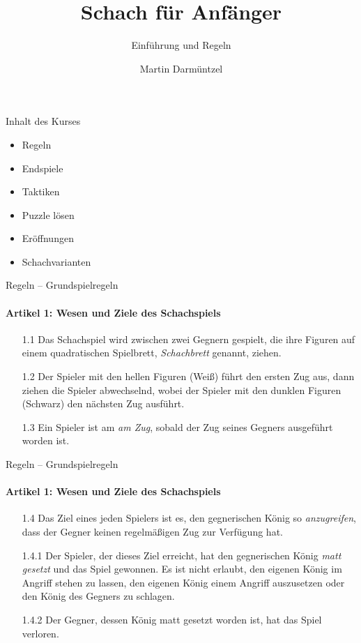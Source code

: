 \documentclass[
  aspectratio=1610,
]{beamer}
\author{Martin Darmüntzel}
\title{Schach für Anfänger}
\subtitle{Einführung und Regeln}
\begin{document}
\begin{frame}
  \titlepage{}
\end{frame}

\begin{frame}{Inhalt des Kurses}
  \begin{itemize}
    \item Regeln
    \item Endspiele
    \item Taktiken
    \item Puzzle lösen
    \item Eröffnungen
    \item Schachvarianten
  \end{itemize}
\end{frame}

\begin{frame}[<+->]{Regeln – Grundspielregeln}
  \framesubtitle{Artikel 1: Wesen und Ziele des Schachspiels}
  \begin{itemize}
    \item[1.1] Das Schachspiel wird zwischen zwei Gegnern gespielt, die ihre Figuren auf
      einem quadratischen Spielbrett, \emph{Schachbrett} genannt, ziehen.
    \item[1.2] Der Spieler mit den hellen Figuren (Weiß) führt den ersten Zug aus, dann
      ziehen die Spieler abwechselnd, wobei der Spieler mit den dunklen Figuren (Schwarz)
      den nächsten Zug ausführt.
    \item[1.3] Ein Spieler ist am \emph{am Zug}, sobald der Zug seines Gegners ausgeführt
      worden ist.
  \end{itemize}
\end{frame}

\begin{frame}[<+->]{Regeln – Grundspielregeln}
  \framesubtitle{Artikel 1: Wesen und Ziele des Schachspiels}
  \begin{itemize}
    \item[1.4] Das Ziel eines jeden Spielers ist es, den gegnerischen König so
      \emph{anzugreifen}, dass der Gegner keinen regelmäßigen Zug zur Verfügung hat.
    \item[1.4.1] Der Spieler, der dieses Ziel erreicht, hat den gegnerischen König
      \emph{matt gesetzt} und das Spiel gewonnen. Es ist nicht erlaubt, den eigenen
      König im Angriff stehen zu lassen, den eigenen König einem Angriff auszusetzen
      oder den König des Gegners zu schlagen.
    \item[1.4.2] Der Gegner, dessen König matt gesetzt worden ist, hat das Spiel
      verloren.
  \end{itemize}
\end{frame}
\end{document}
